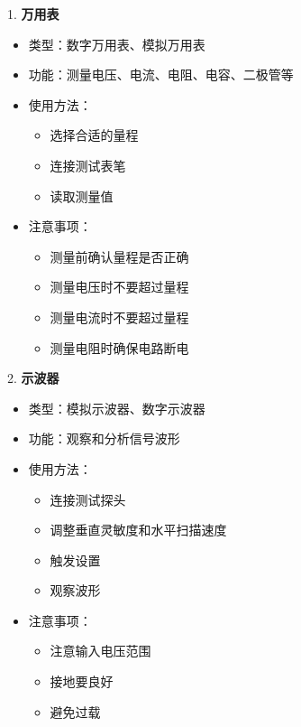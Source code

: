 \documentclass[12pt,UTF8]{ctexbook}
\begin{document}
1. \textbf{万用表}
   \begin{itemize}[leftmargin=3.5em]
   \item 类型：数字万用表、模拟万用表
   \item 功能：测量电压、电流、电阻、电容、二极管等
   \item 使用方法：
     \begin{itemize}
       \item 选择合适的量程
       \item 连接测试表笔
       \item 读取测量值
     \end{itemize}
   \item 注意事项：
     \begin{itemize}
       \item 测量前确认量程是否正确
       \item 测量电压时不要超过量程
       \item 测量电流时不要超过量程
       \item 测量电阻时确保电路断电
     \end{itemize}
   \end{itemize}

2. \textbf{示波器}
   \begin{itemize}[leftmargin=3.5em]
   \item 类型：模拟示波器、数字示波器
   \item 功能：观察和分析信号波形
   \item 使用方法：
     \begin{itemize}
       \item 连接测试探头
       \item 调整垂直灵敏度和水平扫描速度
       \item 触发设置
       \item 观察波形
     \end{itemize}
   \item 注意事项：
     \begin{itemize}
       \item 注意输入电压范围
       \item 接地要良好
       \item 避免过载
     \end{itemize}
   \end{itemize}
\end{document}
